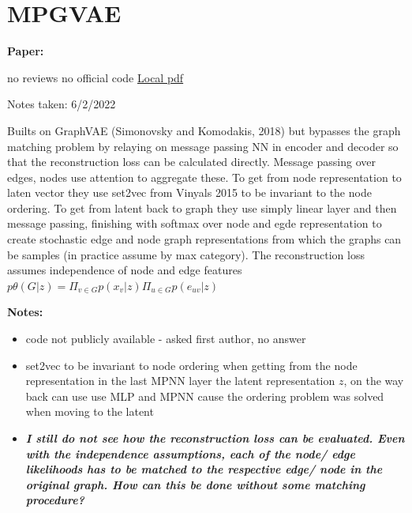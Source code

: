 \clearpage

\section{MPGVAE}\label{sec:MPGVAE}

\begin{notebox}
\textbf{Paper: } 
\vspace{5pt}

no reviews
\hspace{1cm}
no official code
\hspace{1cm}
\href{Flam-Shepherd et al_2021_MPGVAE.pdf}{Local pdf}

\hfill Notes taken: 6/2/2022 
\end{notebox}

\begin{notebox}[colback=red!5]
\tldr Builts on GraphVAE (Simonovsky and Komodakis, 2018) but bypasses the graph matching problem by relaying on message passing NN in encoder and decoder so that the reconstruction loss can be calculated directly. Message passing over edges, nodes use attention to aggregate these.
To get from node representation to laten vector they use set2vec from Vinyals 2015 to be invariant to the node ordering.
To get from latent back to graph they use simply linear layer and then message passing, finishing with softmax over node and egde representation to create stochastic edge and node graph representations from which the graphs can be samples (in practice assume by max category).
The reconstruction loss assumes independence of node and edge features $p\theta(G|z) = \Pi_{v \in G} p(x_v | z) \Pi_{u \in G} p(e_{uv} | z)$
\end{notebox}

\begin{notebox}[colback=yellow!5]
\textbf{Notes:} 
\begin{itemize}[nosep]
\item code not publicly available - asked first author, no answer
\item set2vec to be invariant to node ordering when getting from the node representation in the last MPNN layer the latent representation $z$, on the way back can use use MLP and MPNN cause the ordering problem was solved when moving to the latent
\item \emph{\textbf{I still do not see how the reconstruction loss can be evaluated. Even with the independence assumptions, each of the node/ edge likelihoods has to be matched to the respective edge/ node in the original graph. How can this be done without some matching procedure?}}
\end{itemize}
\end{notebox}


